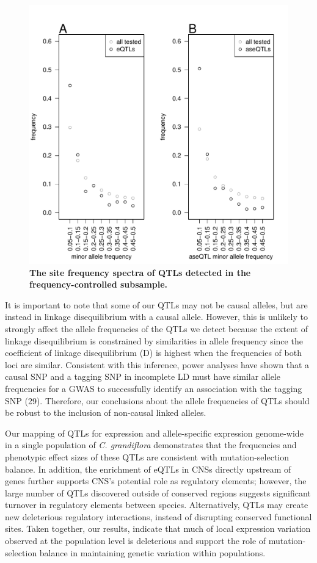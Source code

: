 \begin{figure}[h!]
      \centering
       \includegraphics[width=\linewidth]{Ch3Fig5}
    \caption{\textbf{The site frequency spectra of QTLs detected in the frequency-controlled subsample. }}
    \label{fig:3fig5}
\end{figure}


It is important to note that some of our QTLs may not be causal alleles, but are instead in linkage disequilibrium with a causal allele. However, this is unlikely to strongly affect the allele frequencies of the QTLs we detect because the extent of linkage disequilibrium is constrained by similarities in allele frequency since the coefficient of linkage disequilibrium (D) is highest when the frequencies of both loci are similar. Consistent with this inference, power analyses have shown that a causal SNP and a tagging SNP in incomplete LD must have similar allele frequencies for a GWAS to successfully identify an association with the tagging SNP (29). Therefore, our conclusions about the allele frequencies of QTLs should be robust to the inclusion of non-causal linked alleles. 

Our mapping of QTLs for expression and allele-specific expression genome-wide in a single population of \textit{C. grandiflora} demonstrates that the frequencies and phenotypic effect sizes of these QTLs are consistent with mutation-selection balance. In addition, the enrichment of eQTLs in CNSs directly upstream of genes further supports CNS’s potential role as regulatory elements; however, the large number of QTLs discovered outside of conserved regions suggests significant turnover in regulatory elements between species. Alternatively, QTLs may create new deleterious regulatory interactions, instead of disrupting conserved functional sites. Taken together, our results, indicate that much of local expression variation observed at the population level is deleterious and support the role of mutation-selection balance in maintaining genetic variation within populations.

